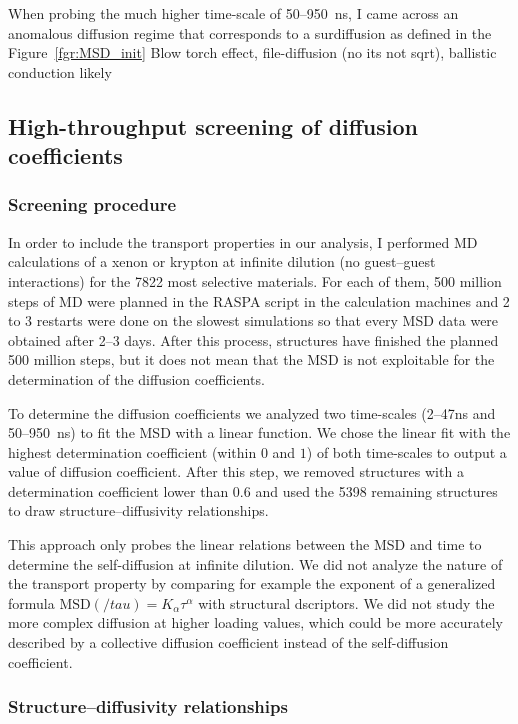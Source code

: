 \documentclass[main]{subfiles}
\begin{document}
When probing the much higher time-scale of 50--950~\si{\ns}, I came across an anomalous diffusion regime that corresponds to a surdiffusion as defined in the Figure~\ref{fgr:MSD_init}
Blow torch effect, file-diffusion (no its not sqrt), ballistic conduction likely 


\subsection{High-throughput screening of diffusion coefficients}

\subsubsection{Screening procedure}

In order to include the transport properties in our analysis, I performed MD calculations of a xenon or krypton at infinite dilution (no guest--guest interactions) for the 7822 most selective materials. For each of them, 500 million steps of MD were planned in the RASPA script in the calculation machines and 2 to 3 restarts were done on the slowest simulations so that every MSD data were obtained after 2--3 days. After this process,  structures have finished the planned 500 million steps, but it does not mean that the MSD is not exploitable for the determination of the diffusion coefficients. 

To determine the diffusion coefficients we analyzed two time-scales (2--47\si{\ns} and 50--950~\si{\ns}) to fit the MSD with a linear function. We chose the linear fit with the highest determination coefficient (within $0$ and $1$) of both time-scales to output a value of diffusion coefficient. After this step, we removed structures with a determination coefficient lower than $0.6$ and used the 5398 remaining structures to draw structure--diffusivity relationships. 

This approach only probes the linear relations between the MSD and time to determine the self-diffusion at infinite dilution. We did not analyze the nature of the transport property by comparing for example the exponent of a generalized formula $\text{MSD}(/tau) = K_\alpha\tau^\alpha$ with structural dscriptors. We did not study the more complex diffusion at higher loading values, which could be more accurately described by a collective diffusion coefficient instead of the self-diffusion coefficient. 

\subsubsection{Structure--diffusivity relationships}
\end{document}
